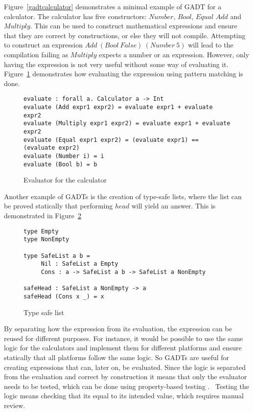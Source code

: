 Figure~\ref{gadtcalculator} demonstrates a minimal example of GADT for a
calculator. The calculator has five constructors: $Number$, $Bool$, $Equal$
$Add$ and $Multiply$. This can be used to construct mathematical expressions and
ensure that they are correct by constructions, or else they will not compile.
Attempting to construct an expression $Add\ (Bool\ False)\ (Number\ 5)$ will
lead to the compilation failing as $Multiply$ expects a number or an expression.
However, only having the expression is not very useful without some way of
evaluating it.  Figure~\ref{calculator} demonstrates how evaluating the
expression using pattern matching is done.

\begin{figure}[H]
    \begin{lstlisting}
evaluate : forall a. Calculator a -> Int
evaluate (Add expr1 expr2) = evaluate expr1 + evaluate expr2
evaluate (Multiply expr1 expr2) = evaluate expr1 + evaluate expr2
evaluate (Equal expr1 expr2) = (evaluate expr1) == (evaluate expr2)
evaluate (Number i) = i
evaluate (Bool b) = b
    \end{lstlisting}
    \caption{Evaluator for the calculator}
    \label{calculator}
\end{figure}

Another example of GADTs is the creation of type-safe lists, where the list can
be proved statically that performing $head$ will yield an answer. This is
demonstrated in Figure~\ref{safelist}

\begin{figure}[H]
    \begin{lstlisting}
type Empty
type NonEmpty

type SafeList a b =
     Nil : SafeList a Empty
     Cons : a -> SafeList a b -> SafeList a NonEmpty

safeHead : SafeList a NonEmpty -> a
safeHead (Cons x _) = x
    \end{lstlisting}
    \caption{Type safe list}
    \label{safelist}
\end{figure}

By separating how the expression from its evaluation, the expression can be
reused for different purposes. For instance, it would be possible to use the
same logic for the calculators and implement them for different platforms and
ensure statically that all platforms follow the same logic. So GADTs are useful
for creating expressions that can, later on, be evaluated.  Since the logic is
separated from the evaluation and correct by construction it means that only the
evaluator needs to be tested, which can be done using property-based testing
.~\cite{hughes2016experiences} Testing the logic means
checking that its equal to its intended value, which requires manual review.

